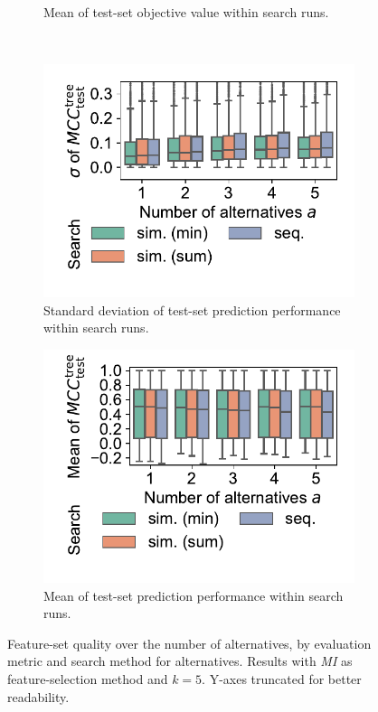 \documentclass{article}
\theoremstyle{definition}
\begin{document}
\begin{figure}[p]
\begin{subfigure}[t]{0.48\textwidth}
		\caption{Mean of test-set objective value with\-in search runs.}
		\label{fig:afs:impact-search-mean-test-objective}
	\end{subfigure}
	\\ \vspace{\baselineskip}
	\begin{subfigure}[t]{0.48\textwidth}
		\centering
		\includegraphics[width=\textwidth, trim=15 25 15 5, clip]{plots/impact-search-stddev-decision-tree-test-mcc.pdf}
		\caption{Standard deviation of test-set prediction performance within search runs.}
		\label{fig:afs:impact-search-stddev-decision-tree-test-mcc}
	\end{subfigure}
	\hfill
	\begin{subfigure}[t]{0.48\textwidth}
		\centering
		\includegraphics[width=\textwidth, trim=15 25 15 5, clip]{plots/impact-search-mean-decision-tree-test-mcc.pdf}
		\caption{Mean of test-set prediction performance within search runs.}
		\label{fig:afs:impact-search-mean-decision-tree-test-mcc}
	\end{subfigure}
	\caption{
		Feature-set quality over the number of alternatives, by evaluation metric and search method for alternatives.
		Results with \emph{MI} as feature-selection method and $k=5$.
		Y-axes truncated for better readability.
	}
	\label{fig:afs:impact-search-quality}
\end{figure}
\end{document}
